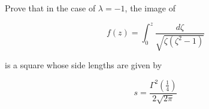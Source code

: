 Prove that in the case of $\lambda = -1$, the image of

$$
f(z) = \int_0^z \frac{d\zeta}{\sqrt{\zeta (\zeta^2 - 1)}}
$$

is a square whose side lengths are given by

$$
s = \frac{\Gamma^2\left(\frac{1}{4}\right)}{2 \sqrt{2 \pi}}
$$
